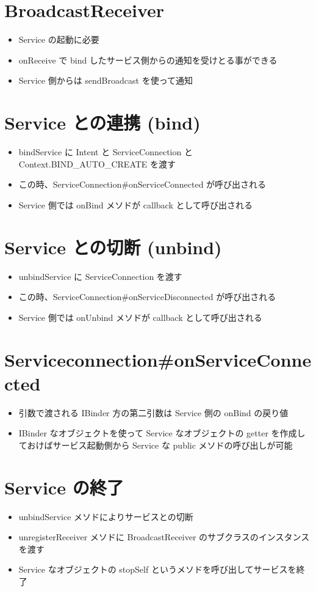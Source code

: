 \documentclass[slide,papersize]{jsarticle}
\begin{document}
\section*{BroadcastReceiver}
\bigskip
\begin{itemize}
\item Service の起動に必要
\bigskip
\item onReceive で bind したサービス側からの通知を受けとる事ができる
\bigskip
\item Service 側からは sendBroadcast を使って通知
\end{itemize}

\section*{Service との連携 (bind)}
\bigskip
\begin{itemize}
\item bindService に Intent と ServiceConnection と Context.BIND\_AUTO\_CREATE を渡す
\bigskip
\item この時、ServiceConnection\#onServiceConnected が呼び出される
\bigskip
\item Service 側では onBind メソドが callback として呼び出される
\end{itemize}

\section*{Service との切断 (unbind)}
\bigskip
\begin{itemize}
\item unbindService に ServiceConnection を渡す
\bigskip
\item この時、ServiceConnection\#onServiceDisconnected が呼び出される
\bigskip
\item Service 側では onUnbind メソドが callback として呼び出される
\end{itemize}

\section*{Serviceconnection\#onServiceConnected}
\bigskip
\begin{itemize}
\item 引数で渡される IBinder 方の第二引数は Service 側の onBind の戻り値
\bigskip
\item IBinder なオブジェクトを使って Service なオブジェクトの getter を作成しておけばサービス起動側から Service な public メソドの呼び出しが可能
\end{itemize}

\section*{Service の終了}
\bigskip
\begin{itemize}
\item unbindService メソドによりサービスとの切断
\bigskip
\item unregisterReceiver メソドに BroadcastReceiver のサブクラスのインスタンスを渡す
\bigskip
\item Service なオブジェクトの stopSelf というメソドを呼び出してサービスを終了
\end{itemize}
\end{document}
